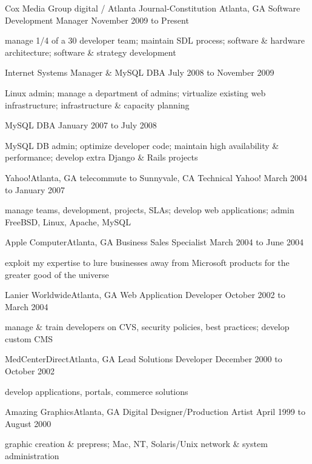 \documentclass[10pt]{article}
\begin{document}

\sectionheader
{Cox Media Group digital / Atlanta Journal-Constitution}
{Atlanta, GA}
{Software Development Manager}
{November 2009 to Present}
\begin{longtext}
manage 1/4 of a 30 developer team;
maintain SDL process;
software \& hardware architecture;
software \& strategy development
\end{longtext}
\sectionsub
{Internet Systems Manager \& MySQL DBA}
{July 2008 to November 2009}
\begin{longtext}
Linux admin;
manage a department of admins;
virtualize existing web infrastructure;
infrastructure \& capacity planning
\end{longtext}
\sectionsub
{MySQL DBA}
{January 2007 to July 2008}
\begin{longtext}
MySQL DB admin;
optimize developer code;
maintain high availability \& performance;
develop extra Django \& Rails projects
\end{longtext}

\sectionheader
{Yahoo!}{Atlanta, GA telecommute to Sunnyvale, CA}
{Technical Yahoo!}
{March 2004 to January 2007}
\begin{longtext}
manage teams, development, projects, SLAs;
develop web applications;
admin FreeBSD, Linux, Apache, MySQL
\end{longtext}

\sectionheader
{Apple Computer}{Atlanta, GA}
{Business Sales Specialist}
{March 2004 to June 2004}
\begin{longtext}
exploit my expertise to lure businesses away from Microsoft products for the greater good of the universe
\end{longtext}

\sectionheader
{Lanier Worldwide}{Atlanta, GA}
{Web Application Developer}
{October 2002 to March 2004}
\begin{longtext}
manage \& train developers on CVS, security policies, best practices;
develop custom CMS
\end{longtext}

\sectionheader
{MedCenterDirect}{Atlanta, GA}
{Lead Solutions Developer}
{December 2000 to October 2002}
\begin{longtext}
develop applications, portals, commerce solutions
\end{longtext}

\sectionheader
{Amazing Graphics}{Atlanta, GA}
{Digital Designer/Production Artist}
{April 1999 to August 2000}
\begin{longtext}
graphic creation \& prepress;
Mac, NT, Solaris/Unix network \& system administration
\end{longtext}
\end{document}
